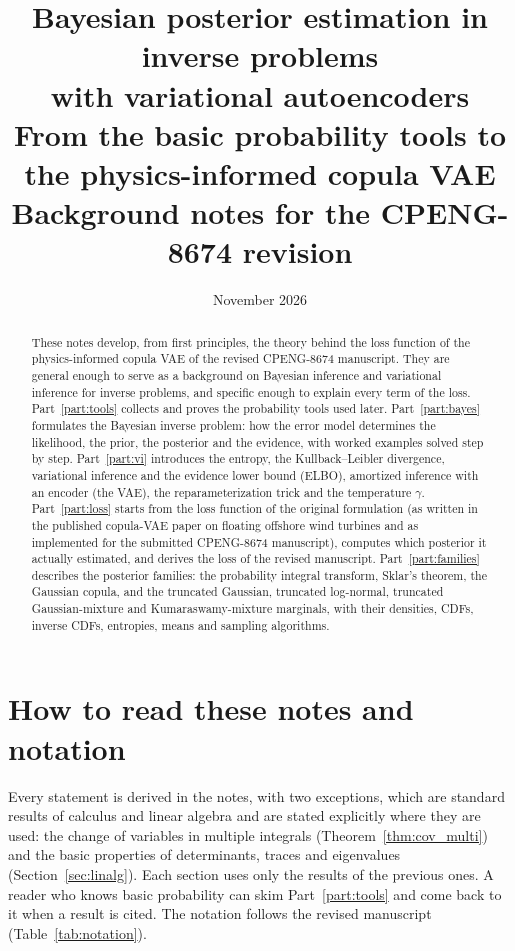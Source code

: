 \documentclass[11pt,a4paper]{article}
\title{Bayesian posterior estimation in inverse problems\\with variational autoencoders\\[0.4em]
\large From the basic probability tools to the physics-informed copula VAE\\
Background notes for the CPENG-8674 revision}
\author{}
\date{November 2026}
\numberwithin{equation}{section}
\theoremstyle{plain}
\theoremstyle{definition}
\theoremstyle{remark}
\begin{document}
\maketitle

\begin{abstract}
These notes develop, from first principles, the theory behind the loss function of the physics-informed copula VAE of the revised CPENG-8674 manuscript. They are general enough to serve as a background on Bayesian inference and variational inference for inverse problems, and specific enough to explain every term of the loss.
Part~\ref{part:tools} collects and proves the probability tools used later.
Part~\ref{part:bayes} formulates the Bayesian inverse problem: how the error model determines the likelihood, the prior, the posterior and the evidence, with worked examples solved step by step.
Part~\ref{part:vi} introduces the entropy, the Kullback--Leibler divergence, variational inference and the evidence lower bound (ELBO), amortized inference with an encoder (the VAE), the reparameterization trick and the temperature $\gamma$.
Part~\ref{part:loss} starts from the loss function of the original formulation (as written in the published copula-VAE paper on floating offshore wind turbines and as implemented for the submitted CPENG-8674 manuscript), computes which posterior it actually estimated, and derives the loss of the revised manuscript.
Part~\ref{part:families} describes the posterior families: the probability integral transform, Sklar's theorem, the Gaussian copula, and the truncated Gaussian, truncated log-normal, truncated Gaussian-mixture and Kumaraswamy-mixture marginals, with their densities, CDFs, inverse CDFs, entropies, means and sampling algorithms.
\end{abstract}

\tableofcontents

\section*{How to read these notes and notation}

Every statement is derived in the notes, with two exceptions, which are standard results of calculus and linear algebra and are stated explicitly where they are used: the change of variables in multiple integrals (Theorem~\ref{thm:cov_multi}) and the basic properties of determinants, traces and eigenvalues (Section~\ref{sec:linalg}).
Each section uses only the results of the previous ones.
A reader who knows basic probability can skim Part~\ref{part:tools} and come back to it when a result is cited.
The notation follows the revised manuscript (Table~\ref{tab:notation}).
\end{document}
